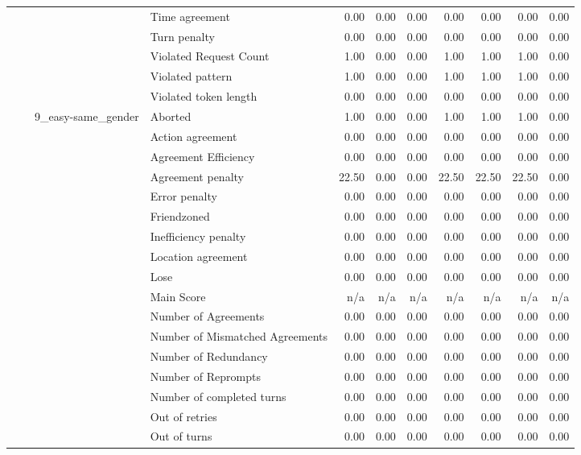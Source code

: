 \begin{tabular}{llllrrrrrrr}
 &  &  & Time agreement & 0.00 & 0.00 & 0.00 & 0.00 & 0.00 & 0.00 & 0.00 \\
 &  &  & Turn penalty & 0.00 & 0.00 & 0.00 & 0.00 & 0.00 & 0.00 & 0.00 \\
 &  &  & Violated Request Count & 1.00 & 0.00 & 0.00 & 1.00 & 1.00 & 1.00 & 0.00 \\
 &  &  & Violated pattern & 1.00 & 0.00 & 0.00 & 1.00 & 1.00 & 1.00 & 0.00 \\
 &  &  & Violated token length & 0.00 & 0.00 & 0.00 & 0.00 & 0.00 & 0.00 & 0.00 \\
\cline{3-11}
 &  & \multirow[t]{27}{*}{9_easy-same_gender} & Aborted & 1.00 & 0.00 & 0.00 & 1.00 & 1.00 & 1.00 & 0.00 \\
 &  &  & Action agreement & 0.00 & 0.00 & 0.00 & 0.00 & 0.00 & 0.00 & 0.00 \\
 &  &  & Agreement Efficiency & 0.00 & 0.00 & 0.00 & 0.00 & 0.00 & 0.00 & 0.00 \\
 &  &  & Agreement penalty & 22.50 & 0.00 & 0.00 & 22.50 & 22.50 & 22.50 & 0.00 \\
 &  &  & Error penalty & 0.00 & 0.00 & 0.00 & 0.00 & 0.00 & 0.00 & 0.00 \\
 &  &  & Friendzoned & 0.00 & 0.00 & 0.00 & 0.00 & 0.00 & 0.00 & 0.00 \\
 &  &  & Inefficiency penalty & 0.00 & 0.00 & 0.00 & 0.00 & 0.00 & 0.00 & 0.00 \\
 &  &  & Location agreement & 0.00 & 0.00 & 0.00 & 0.00 & 0.00 & 0.00 & 0.00 \\
 &  &  & Lose & 0.00 & 0.00 & 0.00 & 0.00 & 0.00 & 0.00 & 0.00 \\
 &  &  & Main Score & n/a & n/a & n/a & n/a & n/a & n/a & n/a \\
 &  &  & Number of Agreements & 0.00 & 0.00 & 0.00 & 0.00 & 0.00 & 0.00 & 0.00 \\
 &  &  & Number of Mismatched Agreements & 0.00 & 0.00 & 0.00 & 0.00 & 0.00 & 0.00 & 0.00 \\
 &  &  & Number of Redundancy & 0.00 & 0.00 & 0.00 & 0.00 & 0.00 & 0.00 & 0.00 \\
 &  &  & Number of Reprompts & 0.00 & 0.00 & 0.00 & 0.00 & 0.00 & 0.00 & 0.00 \\
 &  &  & Number of completed turns & 0.00 & 0.00 & 0.00 & 0.00 & 0.00 & 0.00 & 0.00 \\
 &  &  & Out of retries & 0.00 & 0.00 & 0.00 & 0.00 & 0.00 & 0.00 & 0.00 \\
 &  &  & Out of turns & 0.00 & 0.00 & 0.00 & 0.00 & 0.00 & 0.00 & 0.00 \\

\end{tabular}
